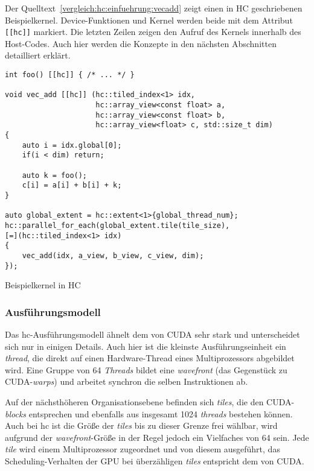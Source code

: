 Der Quelltext~\ref{vergleich:hc:einfuehrung:vecadd} zeigt einen in HC
geschriebenen Beispielkernel. Device-Funktionen und Kernel werden beide
mit dem Attribut \texttt{[[hc]]} markiert. Die letzten Zeilen zeigen den Aufruf
des Kernels innerhalb des Host-Codes. Auch hier werden die Konzepte in den
nächsten Abschnitten detailliert erklärt.

\begin{code}
    \begin{verbatim}
int foo() [[hc]] { /* ... */ }

void vec_add [[hc]] (hc::tiled_index<1> idx,
                     hc::array_view<const float> a,
                     hc::array_view<const float> b,
                     hc::array_view<float> c, std::size_t dim)
{
    auto i = idx.global[0];
    if(i < dim) return;

    auto k = foo();
    c[i] = a[i] + b[i] + k;
}

auto global_extent = hc::extent<1>{global_thread_num};
hc::parallel_for_each(global_extent.tile(tile_size),
[=](hc::tiled_index<1> idx)
{
    vec_add(idx, a_view, b_view, c_view, dim);
});
    \end{verbatim}
    \caption{Beispielkernel in HC}
    \label{vergleich:hc:einfuehrung:vecadd}
\end{code}

\subsubsection{Ausführungsmodell}

Das \gls{hc}-Ausführungsmodell ähnelt dem von CUDA sehr stark und unterscheidet
sich nur in einigen Details. Auch hier ist die kleinste Ausführungseinheit ein
\textit{thread}, die direkt auf einen Hardware-Thread eines Multiprozessors
abgebildet wird. Eine Gruppe von 64 \textit{Threads} bildet eine
\textit{wavefront} (das Gegenstück zu CUDA-\textit{warps}) und arbeitet synchron
die selben Instruktionen ab.

Auf der nächsthöheren Organisationsebene befinden sich \textit{tiles}, die
den CUDA-\textit{blocks} entsprechen und ebenfalls aus insgesamt \num{1024}
\textit{threads} bestehen können. Auch bei \gls{hc} ist die Größe der
\textit{tiles} bis zu dieser Grenze frei wählbar, wird aufgrund der
\textit{wavefront}-Größe in der Regel jedoch ein Vielfaches von 64 sein. Jede
\textit{tile} wird einem Multiprozessor zugeordnet und von diesem ausgeführt,
das Scheduling-Verhalten der GPU bei überzähligen \textit{tiles} entspricht
dem von CUDA.

